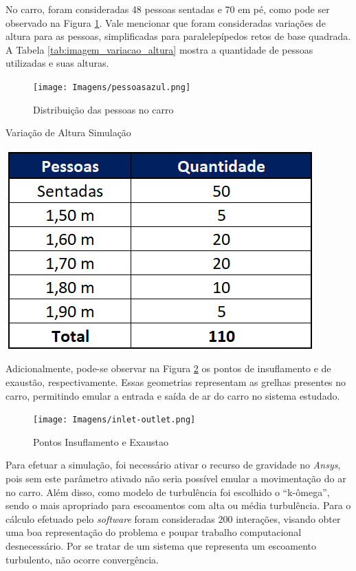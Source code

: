 \documentclass[acronym,symbols,table]{fei}
\begin{document}
 No carro, foram consideradas 48 pessoas sentadas e 70 em pé, como pode ser observado na Figura \ref{fig:PessoasXZ}. Vale mencionar que foram consideradas variações de altura para as pessoas, simplificadas para paralelepípedos retos de base quadrada. A Tabela \ref{tab:imagem_variacao_altura} mostra a quantidade de pessoas utilizadas e suas alturas.

\begin{figure}[!htb]
    \centering
    \caption{Distribuição das pessoas no carro}
    \texttt{[image: Imagens/pessoasazul.png]}
    \label{fig:PessoasXZ}
\end{figure}

\begin{table}[!htb]
    \centering
    \caption{Variação de Altura Simulação}
    \includegraphics[width=0.4\linewidth]{Imagens/imagem_variacao_altura.png}
    \label{tab:imagem_variacao_altura}
\end{table}


\newpage
Adicionalmente, pode-se observar na Figura \ref{fig:inlet-outlet} os pontos de insuflamento e de exaustão, respectivamente. Essas geometrias representam as grelhas presentes no carro, permitindo emular a entrada e saída de ar do carro no sistema estudado.

\begin{figure}[!htb]
    \centering
    \caption{Pontos Insuflamento e Exaustao}
    \texttt{[image: Imagens/inlet-outlet.png]}
    \label{fig:inlet-outlet}
\end{figure}


Para efetuar a simulação, foi necessário ativar o recurso de gravidade no \textit{Ansys}, pois sem este parâmetro ativado não seria possível emular a movimentação do ar no carro. Além disso, como modelo de turbulência foi escolhido o “k-ômega”, sendo o mais apropriado para escoamentos com alta ou média turbulência. Para o cálculo efetuado pelo \textit{software} foram consideradas $200$ interações, visando obter uma boa representação do problema e poupar trabalho computacional desnecessário. Por se tratar de um sistema que representa um escoamento turbulento, não ocorre convergência.
\end{document}
